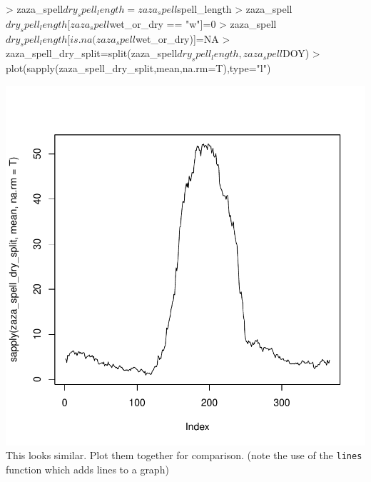 \documentclass{article}
\begin{document}
\begin{Schunk}
\begin{Sinput}
> zaza_spell$dry_spell_length=zaza_spell$spell_length
> zaza_spell$dry_spell_length[zaza_spell$wet_or_dry == "w"]=0
> zaza_spell$dry_spell_length[is.na(zaza_spell$wet_or_dry)]=NA
> zaza_spell_dry_split=split(zaza_spell$dry_spell_length,zaza_spell$DOY)
> plot(sapply(zaza_spell_dry_split,mean,na.rm=T),type="l")
\end{Sinput}
\end{Schunk}
\includegraphics{climate_vignette-022}
This looks similar.  Plot them together for comparison.  (note the use of
the {\tt lines} function which adds lines to a graph)
\end{document}
